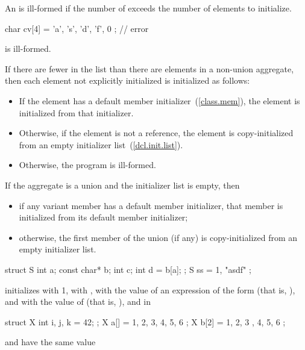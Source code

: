 \pnum
An
is ill-formed if the number of
exceeds the number of elements to initialize.
\begin{example}

\begin{codeblock}
char cv[4] = { 'a', 's', 'd', 'f', 0 };     // error
\end{codeblock}

is ill-formed.
\end{example}

\pnum
If there are fewer  in the list than there
are elements in a non-union aggregate, then each element not explicitly initialized
is initialized as follows:
\begin{itemize}
\item
If the element has a default member initializer~(\ref{class.mem}),
the element is initialized from that initializer.
\item
Otherwise, if the element is not a reference, the element
is copy-initialized from an empty initializer list~(\ref{dcl.init.list}).
\item
Otherwise, the program is ill-formed.
\end{itemize}
If the aggregate is a union and the initializer list is empty, then
\begin{itemize}
\item
if any variant member has a default member initializer,
that member is initialized from its default member initializer;
\item
otherwise, the first member of the union (if any)
is copy-initialized from an empty initializer list.
\end{itemize}
\begin{example}

\begin{codeblock}
struct S { int a; const char* b; int c; int d = b[a]; };
S ss = { 1, "asdf" };
\end{codeblock}

initializes
with 1,
with ,
with the value of an expression of the form
(that is, ), and  with the value of 
(that is, ), and in

\begin{codeblock}
struct X { int i, j, k = 42; };
X a[] = { 1, 2, 3, 4, 5, 6 };
X b[2] = { { 1, 2, 3 }, { 4, 5, 6 } };
\end{codeblock}

 and  have the same value
\end{example}

